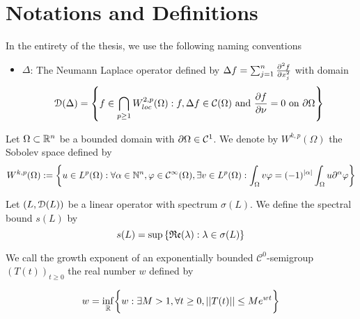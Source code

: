 \section{Notations and Definitions}

In the entirety of the thesis, we use the following naming conventions

\begin{itemize}
    \item $\Delta$: The Neumann Laplace operator defined by $\Delta f = \sum_{j = 1}^n \frac{\partial^2 f}{\partial x_j^2}$ with domain $$\EuScript{D}(\Delta) = \left\{ f \in \bigcap_{p\ge 1} W_{loc}^{2, p}(\Omega) : f, \Delta f \in \mathcal{C}(\Omega) \text{ and } \frac{\partial f}{\partial \nu} = 0 \text{ on } \partial\Omega \right\}$$
\end{itemize}


\begin{definition}
	Let $\Omega \subset \mathbb{R}^n$ be a bounded domain with $\partial \Omega \in \mathcal C^1$. We denote by $W^{k, p}(\Omega)$ the Sobolev space defined by
	$$W^{k, p}(\Omega) := \left\{ u \in L^p(\Omega) : \forall \alpha \in \mathbb{N}^n, \varphi \in \mathcal C^\infty(\Omega), \exists v \in L^p(\Omega) : \int_\Omega v \varphi = (-1)^{|\alpha|} \int_\Omega u \partial^\alpha \varphi \right\}$$   
\end{definition}

\begin{definition}
	Let $(L, \EuScript{D}(L))$ be a linear operator with spectrum $\sigma(L)$. We define the spectral bound $s(L)$ by 
	$$s(L) = \sup \left\{ \mathfrak{Re}(\lambda) : \lambda \in \sigma(L) \right\}$$
\end{definition}


\begin{definition}
	We call the growth exponent of an exponentially bounded $\mathcal{C}^0$-semigroup $(T(t))_{t\ge 0}$ the real number $w$ defined by
	
	$$w = \inf_{\mathbb{R}} \biggl\{ w : \exists M > 1, \forall t \ge 0, ||T(t)|| \le Me^{wt} \biggr\}$$
\end{definition}